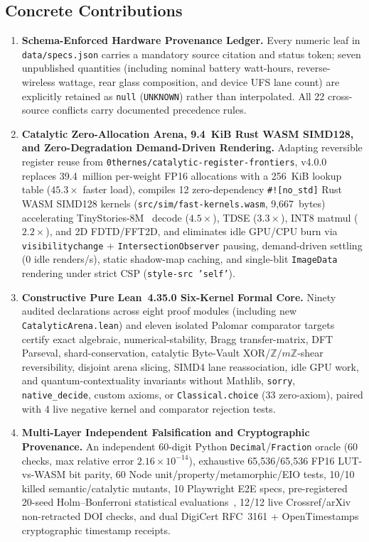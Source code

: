 \documentclass[11pt,a4paper]{amsart}
\newcommand{\code}[1]{{\small\nolinkurl{#1}}}
\theoremstyle{remark}
\newcommand{\Z}{\mathbb{Z}}
\begin{document}
\subsection{Concrete Contributions}
\begin{enumerate}
  \item \textbf{Schema-Enforced Hardware Provenance Ledger.} Every numeric leaf
  in \code{data/specs.json} carries a mandatory source citation and status
  token; seven unpublished quantities (including nominal battery watt-hours,
  reverse-wireless wattage, rear glass composition, and device UFS lane count)
  are explicitly retained as \code{null} (\code{UNKNOWN}) rather than
  interpolated. All 22 cross-source conflicts carry documented precedence rules.
  \item \textbf{Catalytic Zero-Allocation Arena, 9.4~KiB Rust WASM SIMD128, and
  Zero-Degradation Demand-Driven Rendering.} Adapting reversible register reuse
  from \code{0thernes/catalytic-register-frontiers}, v4.0.0 replaces 39.4~million
  per-weight FP16 allocations with a 256~KiB lookup table ($45.3\times$ faster
  load), compiles 12 zero-dependency \code{\#![no_std]} Rust WASM SIMD128
  kernels (\code{src/sim/fast-kernels.wasm}, 9,667~bytes) accelerating
  TinyStories-8M~\cite{eldan2023tinystories} decode ($4.5\times$), TDSE
  ($3.3\times$), INT8 matmul ($2.2\times$), and 2D FDTD/FFT2D, and eliminates
  idle GPU/CPU burn via \code{visibilitychange} + \code{IntersectionObserver}
  pausing, demand-driven settling (0 idle renders/s), static shadow-map caching,
  and single-blit \code{ImageData} rendering under strict CSP
  (\texttt{style-src 'self'}).
  \item \textbf{Constructive Pure Lean~4.35.0 Six-Kernel Formal Core.}
  Ninety audited declarations across eight proof modules (including new
  \code{CatalyticArena.lean}) and eleven isolated Palomar comparator targets
  certify exact algebraic, numerical-stability, Bragg transfer-matrix, DFT
  Parseval, shard-conservation, catalytic Byte-Vault XOR/$\Z/m\Z$-shear
  reversibility, disjoint arena slicing, SIMD4 lane reassociation, idle GPU
  work, and quantum-contextuality invariants without Mathlib, \code{sorry},
  \code{native_decide}, custom axioms, or \code{Classical.choice} (33
  zero-axiom), paired with 4 live negative kernel and comparator rejection tests.
  \item \textbf{Multi-Layer Independent Falsification and Cryptographic Provenance.}
  An independent 60-digit Python \code{Decimal}/\code{Fraction} oracle (60
  checks, max relative error $2.16\times 10^{-14}$), exhaustive 65,536/65,536
  FP16 LUT-vs-WASM bit parity, 60 Node unit/property/metamorphic/EIO tests,
  10/10 killed semantic/catalytic mutants, 10 Playwright E2E specs,
  pre-registered 20-seed Holm--Bonferroni statistical evaluations~\cite{holm1979simple},
  12/12 live Crossref/arXiv non-retracted DOI checks, and dual DigiCert
  RFC~3161 + OpenTimestamps cryptographic timestamp receipts.
\end{enumerate}
\end{document}
